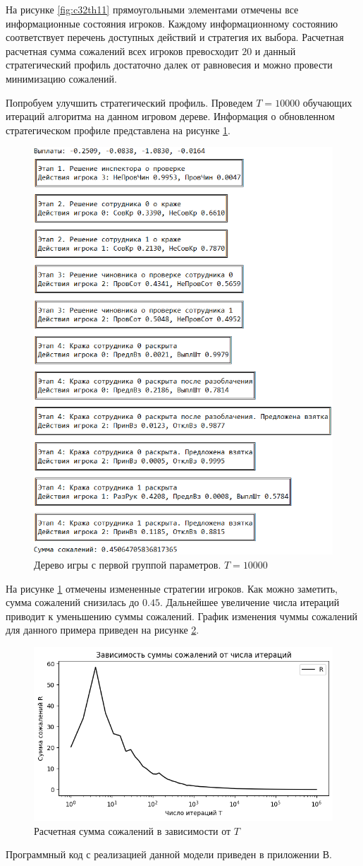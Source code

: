 \par
На рисунке \ref{fig:c32th11} прямоугольными элементами отмечены все информационные состояния игроков. Каждому информационному состоянию соответствует перечень доступных действий и стратегия их выбора. Расчетная расчетная сумма сожалений всех игроков превосходит $20$ и данный стратегический профиль достаточно далек от равновесия и можно провести минимизацию сожалений.
\par
Попробуем улучшить стратегический профиль. Проведем $T=10000$ обучающих итераций алгоритма на данном игровом дереве. Информация о обновленном стратегическом профиле представлена на рисунке \ref{fig:c32th12}.
\begin{figure}[H]
	\centering
	\includegraphics[width=0.8\linewidth]{inc/img/c32th12}
	\caption{Дерево игры с первой группой параметров. $T = 10000$}
	\label{fig:c32th12}
\end{figure}
\par
На рисунке \ref{fig:c32th12} отмечены измененные стратегии игроков. Как можно заметить, сумма сожалений снизилась до $0.45$. Дальнейшее увеличение числа итераций приводит к уменьшению суммы сожалений. График изменения чуммы сожалений для данного примера приведен на рисунке \ref{fig:c3r2}.

\begin{figure}[H]
	\centering
	\includegraphics[width=0.8\linewidth]{inc/img/c3r2}
	\caption{Расчетная сумма сожалений в зависимости от $T$}
	\label{fig:c3r2}
\end{figure}

\par
Программный код с реализацией данной модели приведен в приложении В.